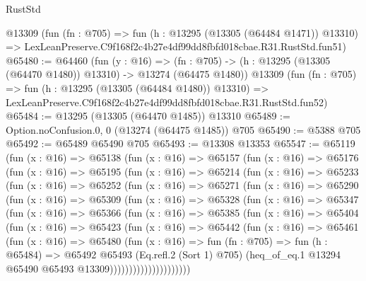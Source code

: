 \begin{lexlean}{RustStd}
\begin{coremodule}
    @13309
    (fun (fn : @705) =>
    fun (h : @13295 (@13305 (@64484 @1471)) @13310) =>
    LexLeanPreserve.C9f168f2c4b27e4df99dd8fbfd018cbae.R31.RustStd.fun51)
@65480 := @64460
    (fun (y : @16) =>
    (fn : @705) -> (h : @13295 (@13305 (@64470 @1480)) @13310) -> @13274 (@64475 @1480))
    @13309
    (fun (fn : @705) =>
    fun (h : @13295 (@13305 (@64484 @1480)) @13310) =>
    LexLeanPreserve.C9f168f2c4b27e4df99dd8fbfd018cbae.R31.RustStd.fun52)
@65484 := @13295 (@13305 (@64470 @1485)) @13310
@65489 := Option.noConfusion.{0, 0} (@13274 (@64475 @1485)) @705
@65490 := @5388 @705
@65492 := @65489 @65490 @705
@65493 := @13308 @13353
@65547 := @65119
    (fun (x : @16) =>
    @65138
      (fun (x : @16) =>
      @65157
        (fun (x : @16) =>
        @65176
          (fun (x : @16) =>
          @65195
            (fun (x : @16) =>
            @65214
              (fun (x : @16) =>
              @65233
                (fun (x : @16) =>
                @65252
                  (fun (x : @16) =>
                  @65271
                    (fun (x : @16) =>
                    @65290
                      (fun (x : @16) =>
                      @65309
                        (fun (x : @16) =>
                        @65328
                          (fun (x : @16) =>
                          @65347
                            (fun (x : @16) =>
                            @65366
                              (fun (x : @16) =>
                              @65385
                                (fun (x : @16) =>
                                @65404
                                  (fun (x : @16) =>
                                  @65423
                                    (fun (x : @16) =>
                                    @65442
                                      (fun (x : @16) =>
                                      @65461
                                        (fun (x : @16) =>
                                        @65480
                                          (fun (x : @16) =>
                                          fun (fn : @705) =>
                                          fun (h : @65484) =>
                                          @65492
                                            @65493
                                            (Eq.refl.{2} (Sort 1) @705)
                                            (heq_of_eq.{1}
                                              @13294
                                              @65490
                                              @65493
                                              @13309)))))))))))))))))))))

\end{coremodule}
\end{lexlean}
